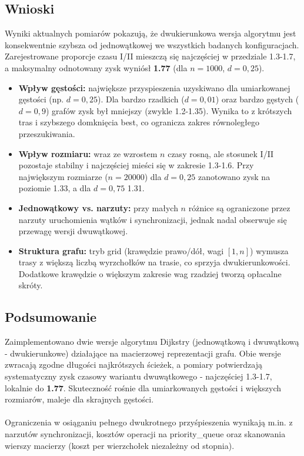 \documentclass[a4paper,12pt]{article}
\begin{document}
        \subsection{Wnioski}
            \vspace{1em}
            Wyniki aktualnych pomiarów pokazują, że dwukierunkowa wersja algorytmu jest konsekwentnie szybsza od jednowątkowej we wszystkich badanych konfiguracjach. Zarejestrowane proporcje czasu I/II mieszczą się najczęściej w przedziale 1.3-1.7, a maksymalny odnotowany zysk wyniósł \textbf{1.77} (dla $n=1000$, $d=0{,}25$).
            \begin{itemize}
                \item \textbf{Wpływ gęstości:} największe przyspieszenia uzyskiwano dla umiarkowanej gęstości (np. $d=0{,}25$). Dla bardzo rzadkich ($d=0{,}01$) oraz bardzo gęstych ($d=0{,}9$) grafów zysk był mniejszy (zwykle 1.2-1.35). Wynika to z krótszych tras i szybszego domknięcia best, co ogranicza zakres równoległego przeszukiwania.
                \item \textbf{Wpływ rozmiaru:} wraz ze wzrostem $n$ czasy rosną, ale stosunek I/II pozostaje stabilny i najczęściej mieści się w zakresie 1.3-1.6. Przy największym rozmiarze ($n=20000$) dla $d=0{,}25$ zanotowano zysk na poziomie 1.33, a dla $d=0{,}75$ 1.31.
                \item \textbf{Jednowątkowy vs. narzuty:} przy małych $n$ różnice są ograniczone przez narzuty uruchomienia wątków i synchronizacji, jednak nadal obserwuje się przewagę wersji dwuwątkowej.
                \item \textbf{Struktura grafu:} tryb grid (krawędzie prawo/dół, wagi $[1,n]$) wymusza trasy z większą liczbą wyrzchołków na trasie, co sprzyja dwukierunkowości. Dodatkowe krawędzie o większym zakresie wag rzadziej tworzą opłacalne skróty.
            \end{itemize}
        \newpage
        \vspace*{2em}
        \subsection{Podsumowanie}
            \vspace{1em}
            Zaimplementowano dwie wersje algorytmu Dijkstry (jednowątkową i dwuwątkową - dwukierunkowe) działające na macierzowej reprezentacji grafu. Obie wersje zwracają zgodne długości najkrótszych ścieżek, a pomiary potwierdzają systematyczny zysk czasowy wariantu dwuwątkowego - najczęściej 1.3-1.7, lokalnie do \textbf{1.77}. Skuteczność rośnie dla umiarkowanych gęstości i większych rozmiarów, maleje dla skrajnych gęstości.\\
            \vspace{0.5em}\\
            Ograniczenia w osiąganiu pełnego dwukrotnego przyśpieszenia wynikają m.in. z narzutów synchronizacji, kosztów operacji na priority\_queue oraz skanowania wierszy macierzy (koszt per wierzchołek niezależny od stopnia).
            \vspace{1.5em}
\end{document}
